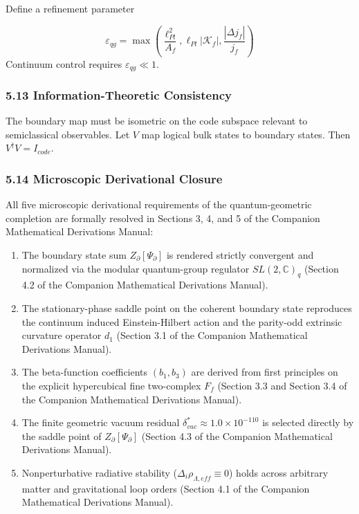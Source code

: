 \documentclass[aps,prd,onecolumn,superscriptaddress,nofootinbib,longbibliography,10pt]{revtex4-2}
\begin{document}
  Define a refinement parameter


  \[ \varepsilon_{qg} = \max\left( \frac{\ell_{Pl}^2}{A_f}, \ell_{Pl}|\mathcal{K}_f|, \frac{|\Delta j_f|}{j_f} \right) \]
  Continuum control requires \(\varepsilon_{qg} \ll 1\).



  
\subsubsection*{5.13 Information-Theoretic Consistency}

  The boundary map must be isometric on the code subspace relevant to semiclassical observables. Let \(V\) map logical bulk states to boundary states. Then \(V^\dagger V = I_{code}\).



  
\subsubsection*{5.14 Microscopic Derivational Closure}

  All five microscopic derivational requirements of the quantum-geometric completion are formally resolved in Sections 3, 4, and 5 of the Companion Mathematical Derivations Manual:


  
\begin{enumerate}
    
\item The boundary state sum \(Z_\partial[\Psi_\partial]\) is rendered strictly convergent and normalized via the modular quantum-group regulator \(SL(2,\mathbb{C})_q\) (Section 4.2 of the Companion Mathematical Derivations Manual).
    
\item The stationary-phase saddle point on the coherent boundary state reproduces the continuum induced Einstein-Hilbert action and the parity-odd extrinsic curvature operator \(d_1\) (Section 3.1 of the Companion Mathematical Derivations Manual).
    
\item The beta-function coefficients \((b_1, b_3)\) are derived from first principles on the explicit hypercubical fine two-complex \(F_f\) (Section 3.3 and Section 3.4 of the Companion Mathematical Derivations Manual).
    
\item The finite geometric vacuum residual \(\delta_{vac}^* \approx 1.0 \times 10^{-110}\) is selected directly by the saddle point of \(Z_\partial[\Psi_\partial]\) (Section 4.3 of the Companion Mathematical Derivations Manual).
    
\item Nonperturbative radiative stability (\(\Delta_i \rho_{\Lambda,eff} \equiv 0\)) holds across arbitrary matter and gravitational loop orders (Section 4.1 of the Companion Mathematical Derivations Manual).
  
\end{enumerate}
\end{document}
